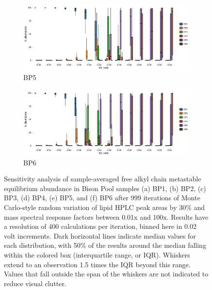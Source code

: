 {\begin{figure}[h]
    \begin{subfigure}[b]{\linewidth}
    	\includegraphics[width=\linewidth]{"figs_ch2/boxplot_ggplot_02bin Bison OF5 iter 999"}
    	\caption{BP5}
        \label{fig:BP5_mc}
    \end{subfigure}
    \begin{subfigure}[b]{\linewidth}
    	\includegraphics[width=\linewidth]{"figs_ch2/boxplot_ggplot_02bin Bison OF6 iter 999"}
    	\caption{BP6}
        \label{fig:BP6_mc}
    \end{subfigure}
    
    \caption[Sensitivity analysis sample-averaged free alkyl chain metastable equilibrium abundance in Bison Pool samples]{Sensitivity analysis of sample-averaged free alkyl chain metastable equilibrium abundance in Bison Pool samples (a) BP1, (b) BP2, (c) BP3, (d) BP4, (e) BP5, and (f) BP6 after 999 iterations of Monte Carlo-style random variation of lipid HPLC peak areas by 30\% and mass spectral response factors between 0.01x and 100x. Results have a resolution of 400 calculations per iteration, binned here in 0.02 volt increments. Dark horizontal lines indicate median values for each distribution, with 50\% of the results around the median falling within the colored box (interquartile range, or IQR). Whiskers extend to an observation 1.5 times the IQR beyond this range. Values that fall outside the span of the whiskers are not indicated to reduce visual clutter.}
    \label{fig:bison_mc}
\end{figure}
\doublespace
\clearpage
}

